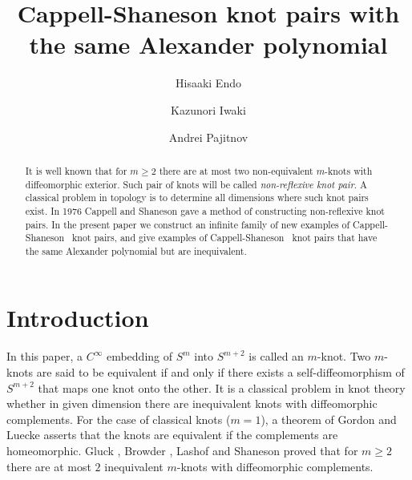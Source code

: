 \documentclass[12pt]{amsart}
\title{Cappell-Shaneson knot pairs with the same Alexander polynomial}
\author[H.~Endo]{Hisaaki Endo}
\author[K.~Iwaki]{Kazunori Iwaki}
\author[A.~Pajitnov]{Andrei Pajitnov}
\newcommand{\bc}{}
\newcommand{\upperset}[2]{%
    \underset{%
        \text{\raisebox{1ex}{\smash{\fontsize{5}{5}$#1$}}}
              }{#2}%
                         }
\newcommand{\csss}{Cappell-Shaneson~ }
\theoremstyle{plain}
\theoremstyle{definition}
\theoremstyle{remark}
\renewcommand{\geq}{\geqslant}
\renewcommand{\(}{\big(}
\renewcommand{\)}{\big)}
\theoremstyle{plain}
\theoremstyle{definition}
\begin{document}
\begin{abstract}
{\bc
It is well known that for $m\geq 2$
there are at most two non-equivalent $m$-knots with diffeomorphic
exterior. Such pair of knots will be called {\it non-reflexive knot pair}.
A classical problem in topology is to
determine all dimensions where such
knot pairs
exist. In 1976 Cappell and Shaneson gave a method
of constructing non-reflexive knot pairs. In the present paper we construct
an infinite family of new examples of \csss knot pairs, and give examples of
\csss knot pairs that have the same Alexander polynomial but are inequivalent.}

\end{abstract}
\maketitle

\newcommand{\stss}{\sim_*}



\section{Introduction}
In this paper, a $C^{\infty}$ embedding of $S^{m}$ into $S^{m+2}$ is called an $m$-knot.
Two $m$-knots are said to be equivalent if and only if there exists a self-diffeomorphism of $S^{m+2}$ that maps one knot onto the other. It is a classical problem in knot theory whether in given
dimension there are inequivalent knots with diffeomorphic
{\bc complements}.
For the case of classical knots ($m=1$), {\bc a theorem of } Gordon and Luecke \cite[Theorem 1]{Gordon-Luecke:1989} asserts that the knots are equivalent if the {\bc complements} are homeomorphic.
 Gluck \cite[Theorem 1.]{Gluck:1961}, Browder \cite[Corollary 3.]{Browder:1967}, Lashof and Shaneson \cite[Theorem 1.5.]{Lashof-Shaneson:1969} proved that for $m \ge 2$ there are at most $2$ inequivalent $m$-knots with diffeomorphic complements.
\end{document}
